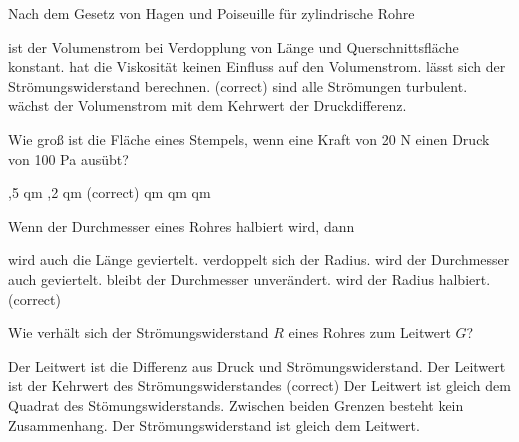 \documentclass[11pt]{exam}
\begin{document}
\setlength{\voffset}{-0.5in}
\setlength{\headsep}{5pt}

\hspace{2mm}
 \hspace{5mm}
\vspace{4mm}

\begin{questions}

\question Nach dem Gesetz von Hagen und Poiseuille für zylindrische Rohre

\begin{choices}
	\choice ist der Volumenstrom bei Verdopplung von Länge und Querschnittsfläche konstant.
	\choice hat die Viskosität keinen Einfluss auf den Volumenstrom.
	\choice lässt sich der Strömungswiderstand berechnen. (correct)
	\choice sind alle Strömungen turbulent.
	\choice wächst der Volumenstrom mit dem Kehrwert der Druckdifferenz.
\end{choices}

\vspace{3mm}\question Wie groß ist die Fläche eines Stempels, wenn eine Kraft von 20 N einen Druck von 100 Pa ausübt?

\begin{choices}
	,5 qm
	,2 qm (correct)
	 qm
	 qm
	 qm
\end{choices}

\vspace{3mm}\question Wenn der Durchmesser eines Rohres halbiert wird, dann

\begin{choices}
	\choice wird auch die Länge geviertelt.
	\choice verdoppelt sich der Radius.
	\choice wird der Durchmesser auch geviertelt.
	\choice bleibt der Durchmesser unverändert.
	\choice wird der Radius halbiert. (correct)
\end{choices}

\vspace{3mm}\question Wie verhält sich der Strömungswiderstand \(R\) eines Rohres zum Leitwert \(G\)?

\begin{choices}
	\choice Der Leitwert ist die Differenz aus Druck und Strömungswiderstand.
	\choice Der Leitwert ist der Kehrwert des Strömungswiderstandes (correct)
	\choice Der Leitwert ist gleich dem Quadrat des Stömungswiderstands.
	\choice Zwischen beiden Grenzen besteht kein Zusammenhang.
	\choice Der Strömungswiderstand ist gleich dem Leitwert.
\end{choices}


\end{questions}
\end{document}
